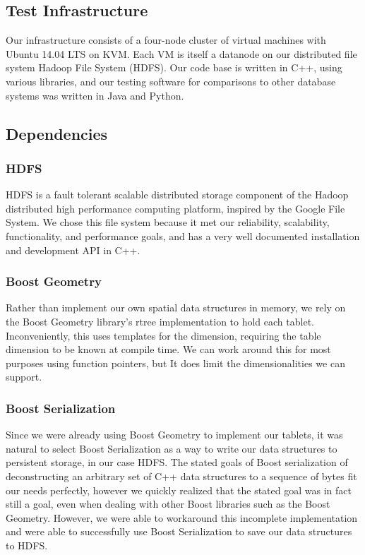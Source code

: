 \documentclass[11pt]{article}
\begin{document}
\subsection{Test Infrastructure}

Our infrastructure consists of a four-node cluster of virtual machines with Ubuntu 14.04 LTS on KVM. Each VM is itself a datanode on our distributed file system Hadoop File System (HDFS)\cite{hdfs}. Our code base is written in C++, using various libraries, and our testing software for comparisons to other database systems was written in Java and Python.

\subsection{Dependencies}

\subsubsection{HDFS}

HDFS is a fault tolerant scalable distributed storage component of the Hadoop distributed high performance computing platform, inspired by the Google File System. We chose this file system because it met our reliability, scalability, functionality, and performance goals, and has a very well documented installation and development API in C++. 

\subsubsection{Boost Geometry}

Rather than implement our own spatial data structures in memory, we rely on the Boost Geometry\cite{boost} library's rtree implementation to hold each tablet. Inconveniently, this uses templates for the dimension, requiring the table dimension to be known at compile time. We can work around this for most purposes using function pointers, but It does limit the dimensionalities we can support.

\subsubsection{Boost Serialization}

Since we were already using Boost Geometry to implement our tablets, it was natural to select Boost Serialization as a way to write our data structures to persistent storage, in our case HDFS. The stated goals of Boost serialization of deconstructing an arbitrary set of C++ data structures to a sequence of bytes fit our needs perfectly, however we quickly realized that the stated goal was in fact still a goal, even when dealing with other Boost libraries such as the Boost Geometry. However, we were able to workaround this incomplete implementation and were able to successfully use Boost Serialization to save our data structures to HDFS.
\end{document}
